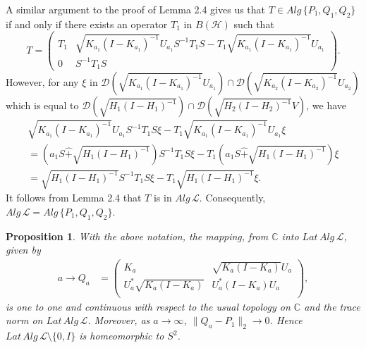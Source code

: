 \documentclass[12pt]{article}
\newtheorem{prop}{Proposition}[section]
\newcommand{\DDD}{\mathcal D}
\newcommand{\HHH}{\mathcal H} %
\newcommand{\LLL}{\mathcal L} %
\newcommand{\C}{\mathbb C} %
\def\L{{\mathcal{L}}}
\begin{document}
{A similar argument to the proof of Lemma 2.4 gives us that $T \in
Alg\,\{P_1,Q_1,Q_2\}$ if and only if there exists an operator $T_1$
in $B(\HHH)$ such that
$$T=\left(\begin{array}{cc} T_1 & \sqrt{K_{a_1}(I-K_{a_1})^{-1}}U_{a_1}S^{-1}T_1 S-T_1\sqrt{K_{a_1}(I-K_{a_1})^{-1}}U_{a_1}\\
0 & S^{-1}T_1 S\end{array}\right).$$ However, for any $\xi$ in
$\DDD(\sqrt{K_{a_1}(I-K_{a_1})^{-1}}U_{a_1}) \cap
\DDD(\sqrt{K_{a_2}(I-K_{a_2})^{-1}}U_{a_2})$ which is equal to $
\DDD(\sqrt{H_1(I-H_{1})^{-1}}) \cap
\DDD(\sqrt{H_2(I-H_{2})^{-1}}V)$, we have
$$\begin{array}{l}
 \sqrt{K_{a_1}(I-K_{a_1})^{-1}}U_{a_1}S^{-1}T_1 S\xi -T_1\sqrt{K_{a_1}(I-K_{a_1})^{-1}}U_{a_1}\xi\\
=(a_1S\widehat{+} \sqrt{H_1(I-H_1)^{-1}})S^{-1}T_1S\xi- T_1 (a_1S \widehat{+} \sqrt{H_1(I-H_1)^{-1}})\xi\\
=\sqrt{H_1(I-H_1)^{-1}}S^{-1}T_1S\xi-T_1\sqrt{H_1(I-H_1)^{-1}}\xi.\end{array}$$
It follows from Lemma 2.4 that $T$ is in $ Alg\,\L$. Consequently,
$Alg\,\LLL =  Alg\,\{P_1, Q_1, Q_2\}$. \vspace{2mm}

\begin{prop}
With the above notation, the mapping, from $\C$ into
$Lat\,Alg\,\LLL$, given by
\begin{align*} a \rightarrow Q_{a} &=
\left(
          \begin{array}{cc}
            K_{a} & \sqrt{K_{a}(I-K_{a})}U_{a} \\
            U_{a}^{*}\sqrt{K_{a}(I-K_{a})} & U_{a}^{*}(I-K_{a})U_{a} \\
          \end{array}
        \right),
\end{align*}
is one to one and continuous with respect to the usual topology on
$\C$ and the trace norm on $Lat\,Alg\,\LLL$. Moreover, as $a
\rightarrow \infty$, $\|Q_{a} - P_1 \|_{2} \rightarrow 0$. Hence
$Lat\,Alg\,\LLL\setminus\{0,I\}$ is homeomorphic to $S^2$.
\end{prop}

}
\end{document}

